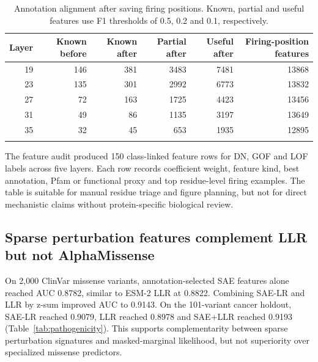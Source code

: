 \documentclass[pdflatex,sn-nature]{sn-jnl}
\begin{document}
\begin{table}[h]
\caption{Annotation alignment after saving firing positions. Known, partial and useful features use F1 thresholds of 0.5, 0.2 and 0.1, respectively.}\label{tab:annotation}
\begin{tabular}{@{}rrrrrr@{}}
\toprule
Layer & Known before & Known after & Partial after & Useful after & Firing-position features \\
\midrule
19 & 146 & 381 & 3483 & 7481 & 13868 \\
23 & 135 & 301 & 2992 & 6773 & 13832 \\
27 & 72  & 163 & 1725 & 4423 & 13456 \\
31 & 49  & 86  & 1135 & 3197 & 13649 \\
35 & 32  & 45  & 653  & 1935 & 12895 \\
\botrule
\end{tabular}
\end{table}

The feature audit produced 150 class-linked feature rows for DN, GOF and LOF labels across five layers. Each row records coefficient weight, feature kind, best annotation, Pfam or functional proxy and top residue-level firing examples. The table is suitable for manual residue triage and figure planning, but not for direct mechanistic claims without protein-specific biological review.

\subsection{Sparse perturbation features complement LLR but not AlphaMissense}

On 2,000 ClinVar missense variants, annotation-selected SAE features alone reached AUC 0.8782, similar to ESM-2 LLR at 0.8822. Combining SAE-LR and LLR by z-sum improved AUC to 0.9143. On the 101-variant cancer holdout, SAE-LR reached 0.9079, LLR reached 0.8978 and SAE+LLR reached 0.9193 (Table~\ref{tab:pathogenicity}). This supports complementarity between sparse perturbation signatures and masked-marginal likelihood, but not superiority over specialized missense predictors.
\end{document}
